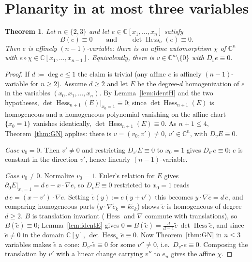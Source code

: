 \documentclass[11pt]{article}
\theoremstyle{plain}
\newtheorem{theorem}{Theorem}[section]
\theoremstyle{definition}
\newcommand{\C}{\mathbb{C}}
\newcommand{\Hess}{\operatorname{Hess}}
\begin{document}
\section{Planarity in at most three variables}\label{sec:planar}

\begin{theorem}\label{thm:F}
Let $n\in\{2,3\}$ and let $e\in\C[x_1,\dots,x_n]$ satisfy
\[
B(e)\equiv0\qquad\text{and}\qquad\det\Hess_n(e)\equiv0 .
\]
Then $e$ is affinely $(n-1)$-variable: there is an affine automorphism
$\chi$ of $\C^n$ with $e\circ\chi\in\C[x_1,\dots,x_{n-1}]$. Equivalently,
there is $v\in\C^n\setminus\{0\}$ with $D_ve\equiv0$.
\end{theorem}

\begin{proof}
If $d:=\deg e\le1$ the claim is trivial (any affine $e$ is affinely
$(n-1)$-variable for $n\ge2$). Assume $d\ge2$ and let $E$ be the
degree-$d$ homogenization of $e$ in the variables $(x_0,x_1,\dots,x_n)$.
By Lemma~\ref{lem:identH} and the two hypotheses,
$\det\Hess_{n+1}(E)|_{x_0=1}\equiv0$; since $\det\Hess_{n+1}(E)$ is
homogeneous and a homogeneous polynomial vanishing on the affine chart
$\{x_0=1\}$ vanishes identically, $\det\Hess_{n+1}(E)\equiv0$. As
$n+1\le4$, Theorem~\ref{thm:GN} applies: there is
$v=(v_0,v')\ne0$, $v'\in\C^n$, with $D_vE\equiv0$.

\emph{Case $v_0=0$.} Then $v'\ne0$ and restricting $D_{v'}E\equiv0$ to
$x_0=1$ gives $D_{v'}e\equiv0$: $e$ is constant in the direction $v'$,
hence linearly $(n-1)$-variable.

\emph{Case $v_0\ne0$.} Normalize $v_0=1$. Euler's relation for $E$ gives
$\partial_0E|_{x_0=1}=d\,e-x\!\cdot\!\nabla e$, so $D_vE\equiv0$ restricted
to $x_0=1$ reads $d\,e=(x-v')\!\cdot\!\nabla e$. Setting
$\tilde e(y):=e(y+v')$ this becomes $y\!\cdot\!\nabla\tilde e=d\,\tilde e$,
and comparing homogeneous parts ($y\!\cdot\!\nabla\tilde e_k=k\tilde e_k$)
shows $\tilde e$ is homogeneous of degree $d\ge2$. $B$ is translation
invariant ($\Hess$ and $\nabla$ commute with translations), so
$B(\tilde e)\equiv0$; Lemma~\ref{lem:identE} gives
$0=B(\tilde e)=\tfrac{d}{d-1}\tilde e\,\det\Hess\tilde e$, and since
$\tilde e\ne0$ in the domain $\C[y]$, $\det\Hess_n\tilde e\equiv0$. Now
Theorem~\ref{thm:GN} in $n\le3$ variables makes $\tilde e$ a cone:
$D_{v''}\tilde e\equiv0$ for some $v''\ne0$, i.e.\ $D_{v''}e\equiv0$.
Composing the translation by $v'$ with a linear change carrying $v''$ to
$e_n$ gives the affine $\chi$.
\end{proof}
\end{document}
